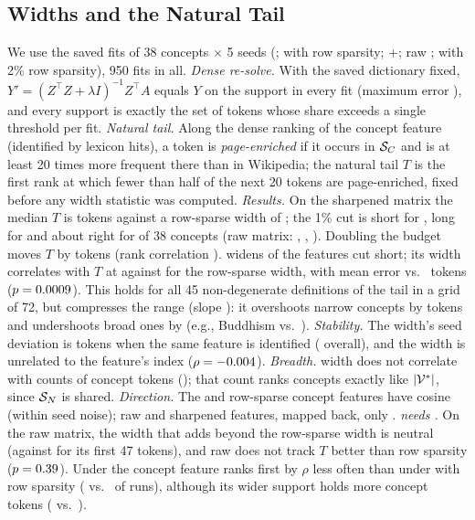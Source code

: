 \subsection{Widths and the Natural Tail}
\label{app:gs-tail}
We use the saved fits of 38 concepts $\times$ 5 seeds (\ember{}; \cs{} with row sparsity; \cs{}+\gs{}; raw \gs{}; \cs{} with 2\% row sparsity), 950 fits in all.
\emph{Dense re-solve.} With the saved dictionary fixed, $Y' = (Z^{\top}Z+\lambda I)^{-1}Z^{\top}A$ equals $Y$ on the support in every fit (maximum error ), and every \gs{} support is exactly the set of tokens whose share exceeds a single threshold per fit.
\emph{Natural tail.} Along the dense ranking of the concept feature (identified by lexicon hits), a token is \emph{page-enriched} if it occurs in $\mathcal{S}_C$ and is at least 20 times more frequent there than in Wikipedia; the natural tail $T$ is the first rank at which fewer than half of the next 20 tokens are page-enriched, fixed before any width statistic was computed.
\emph{Results.} On the sharpened matrix the median $T$ is  tokens against a row-sparse width of ; the 1\% cut is short for , long for  and about right for  of 38 concepts (raw matrix: , , ).
Doubling the budget moves $T$ by  tokens (rank correlation ).
\gs{} widens  of the  features cut short; its width correlates with $T$ at  against  for the row-sparse width, with mean error  vs.\  tokens ($p = 0.0009$).
This holds for all 45 non-degenerate definitions of the tail in a grid of 72, but \gs{} compresses the range (slope ): it overshoots narrow concepts by  tokens and undershoots broad ones by  (e.g., Buddhism  vs.\ ).
\emph{Stability.} The width's seed deviation is  tokens when the same feature is identified ( overall), and the width is unrelated to the feature's index ($\rho = -0.004$).
\emph{Breadth.} \gs{} width does not correlate with counts of concept tokens (); that count ranks concepts exactly like $|\mathcal{V}^*|$, since $\mathcal{S}_N$ is shared.
\emph{Direction.} The \gs{} and row-sparse concept features have cosine  (within seed noise); raw and sharpened features, mapped back, only .
\emph{\gs{} needs \cs{}.} On the raw matrix, the width that \gs{} adds beyond the row-sparse width is  neutral (against  for its first 47 tokens), and raw \gs{} does not track $T$ better than row sparsity ($p = 0.39$).
Under \gs{} the concept feature ranks first by $\rho$ less often than under \cs{} with row sparsity ( vs.\  of runs), although its wider support holds more concept tokens ( vs.\ ).
